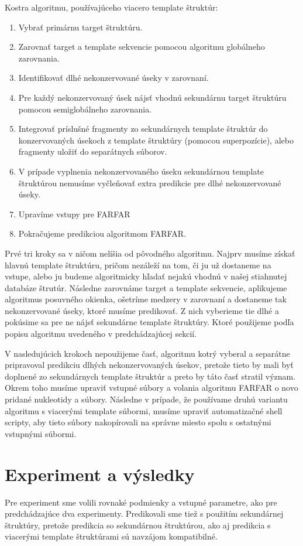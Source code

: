 \indent Kostra algoritmu, používajúceho viacero template štruktúr:
\begin{enumerate}
\item Vybrať primárnu target štruktúru.
\item Zarovnať  target a template sekvencie pomocou algoritmu globálneho zarovnania.
\item Identifikovať dlhé nekonzervované úseky v zarovnaní.
\item Pre každý nekonzervovaný úsek nájsť vhodnú sekundárnu target štruktúru pomocou semiglobálneho zarovnania.
\item Integrovať príslušné fragmenty zo sekundárnych template štruktúr do konzervovaných úsekoch z template štruktúry (pomocou superpozície), alebo fragmenty uložiť do separátnych súborov.
\item V prípade vyplnenia nekonzervovaného úseku sekundárnou template štruktúrou nemusíme vyčleňovať extra predikcie pre dlhé nekonzervované úseky.
\item Upravíme vstupy pre FARFAR
\item Pokračujeme predikciou algoritmom FARFAR.
\end{enumerate}


\indent Prvé tri kroky sa v ničom nelíšia od pôvodného algoritmu. Najprv musíme získať hlavnú template štruktúru, pričom nezáleží na tom, či ju už dostaneme na vstupe, alebo ju budeme algoritmicky hľadať  nejakú vhodnú v našej stiahnutej databáze štrutúr. Následne zarovnáme target a template sekvencie, aplikujeme algoritmus posuvného okienka, ošetríme medzery v zarovnaní a dostaneme tak nekonzervované úseky, ktoré musíme predikovať. Z nich vyberieme tie dlhé a pokúsime sa pre ne nájsť sekundárne template štruktúry. Ktoré použijeme podľa popisu algoritmu uvedeného v predchádzajúcej sekcií.


\indent V nasledujúcich krokoch nepoužijeme časť, algoritmu kotrý vyberal a separátne pripravoval predikciu dlhých nekonzervovaných úsekov, pretože tieto by mali byť doplnené zo sekundárnych template štruktúr a preto by táto časť stratil význam. Okrem toho musíme upraviť vstupné súbory a volania algoritmu FARFAR o novo pridané nukleotidy a súbory. Následne v prípade, že používame druhú variantu algoritmu s viacerými template súbormi, musíme upraviť automatizačné shell scripty, aby tieto súbory nakopírovali na správne miesto spolu s ostatnými vstupnými súbormi.


\section{Experiment a výsledky} 
Pre experiment sme volili rovnaké podmienky a vstupné parametre, ako pre predchádzajúce dva experimenty. Predikovali sme tiež s použitím sekundárnej štruktúry, pretože predikcia so sekundárnou štruktúrou, ako aj predikcia s viacerými template štruktúrami sú navzájom kompatibilné.


